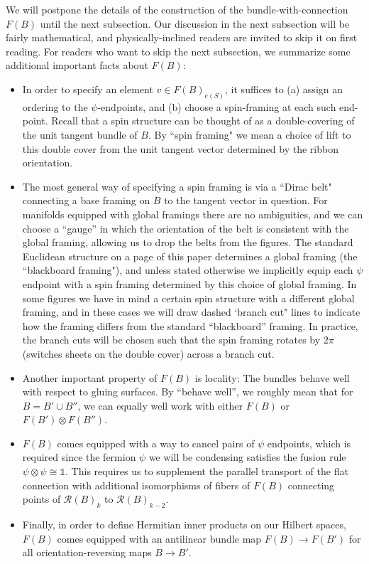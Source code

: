 \documentclass[12pt,a4paper]{article}
\newcommand{\tp}{\otimes}
\newcommand{\unit}{\mathds{1}}
\newcommand{\mcr}{\mathcal{R}}
\begin{document}
\medskip

We will postpone the details of the construction of the bundle-with-connection $F(B)$ until the next subsection.
Our discussion in the next subsection will be fairly mathematical, and physically-inclined readers are invited to skip it on first reading. 
For readers who want to skip the next subsection, we summarize some additional important facts about $F(B)$:
\begin{itemize}
\item In order to specify an element $v\in F(B)_{e(S)}$, it suffices to (a) assign an ordering to the $\psi$-endpoints,
and (b) choose a spin-framing at each such end-point.
Recall that a spin structure can be thought of as a double-covering of the unit tangent bundle of $B$.
By ``spin framing" we mean a choice of lift to this double cover from the unit tangent vector determined by the ribbon orientation.
\item The most general way of specifying a spin framing is via a ``Dirac belt" connecting a base framing 
on $B$ to the tangent vector in question.
For manifolds equipped with global framings there are no ambiguities, and we can choose
a ``gauge'' in which the orientation of the belt is consistent
with the global framing, allowing us to drop the belts from the figures.
The standard Euclidean structure on a page of this paper determines a global framing (the ``blackboard framing"),
and unless stated otherwise we implicitly equip each 
$\psi$ endpoint with a spin framing determined by this choice of global framing.
In some figures we have in mind a certain spin structure with a different global framing,
and in these cases we will draw dashed `branch cut" lines to indicate how the framing
differs from the standard ``blackboard'' framing. In practice, the branch cuts will be chosen such that 
the spin framing rotates by $2\pi$ (switches sheets on the double cover) across a branch cut. 
\item Another important property of $F(B)$ is locality: The bundles behave well with respect to gluing surfaces.
By ``behave well'', we roughly mean that for $B = B' \cup B''$, we can equally well work with 
either $F(B)$ or $F(B')\tp F(B'')$.
\item $F(B)$ comes equipped with a way to cancel pairs of $\psi$ endpoints, which is required since the fermion $\psi$ we will be condensing satisfies the fusion rule $\psi \tp \psi \cong \unit$.
This requires us to supplement the parallel transport of the flat connection with additional isomorphisms of
fibers of $F(B)$ connecting points of $\mcr(B)_k$ to $\mcr(B)_{k-2}$.
\item Finally, in order to define Hermitian inner products on our Hilbert spaces, $F(B)$ comes equipped with 
an antilinear bundle map $F(B) \to F(B')$ for all orientation-reversing maps $B \to B'$.
\end{itemize}
\end{document}

